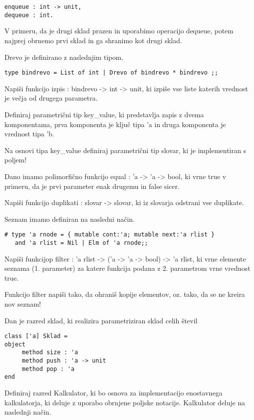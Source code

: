 \begin{ex}
\begin{verbatim}
enqueue : int -> unit, 
dequeue : int. 

\end{verbatim}
V primeru, da je drugi sklad prazen in uporabimo operacijo dequeue, potem najprej obrnemo prvi sklad in ga shranimo kot drugi sklad.



\end{ex} \begin{ex}
Drevo je definirano z naslednjim tipom. 

\begin{verbatim}
type bindrevo = List of int | Drevo of bindrevo * bindrevo ;; 
\end{verbatim}

Napi\v si funkcijo izpis : bindrevo -> int -> unit, ki izpi\v se vse liste katerih vrednost je ve\v cja od drugega parametra. 


\end{ex} \begin{ex}
Definiraj parametri\v cni tip key\_value, ki predstavlja zapis z dvema komponentama, prva komponenta je klju\v c tipa 'a in druga komponenta je vrednost tipa 'b. 

Na osnovi tipa key\_value definiraj parametri\v cni tip slovar, ki je implementiran s poljem! 

Dano imamo polimorfi\v cno funkcijo equal : 'a -> 'a -> bool, ki vrne true v primeru, da je prvi parameter enak drugemu in false sicer. 

Napi\v si funkcijo duplikati : slovar -> slovar, ki iz slovarja odstrani vse duplikate. 


\end{ex} \begin{ex}
Seznam imamo definiran na nasledni na\v cin. 
\begin{verbatim}
# type 'a rnode = { mutable cont:'a; mutable next:'a rlist } 
   and 'a rlist = Nil | Elm of 'a rnode;; 
\end{verbatim}
Napi\v si funkcijop filter : 'a rlist -> ('a -> 'a -> bool) -> 'a rlist, ki vrne elemente seznama (1. parameter) za katere funkcija podana z 2. parametrom vrne vrednost true.

Funkcijo filter napi\v si tako, da ohrani\v s kopije elementov, oz. tako, da se ne kreira nov seznam!


\end{ex} \begin{ex}
Dan je razred sklad, ki realizira parametriziran sklad celih \v stevil
\begin{verbatim}
class ['a] Sklad =
object 
     method size : 'a
     method push : 'a -> unit
     method pop : 'a
end
\end{verbatim}
Definiraj razred Kalkulator, ki bo osnova za implementacijo enostavnega kalkulatorja, ki deluje z uporabo obrnjene poljske notacije. Kalkulator deluje na naslednji na\v cin.  


\end{ex}
